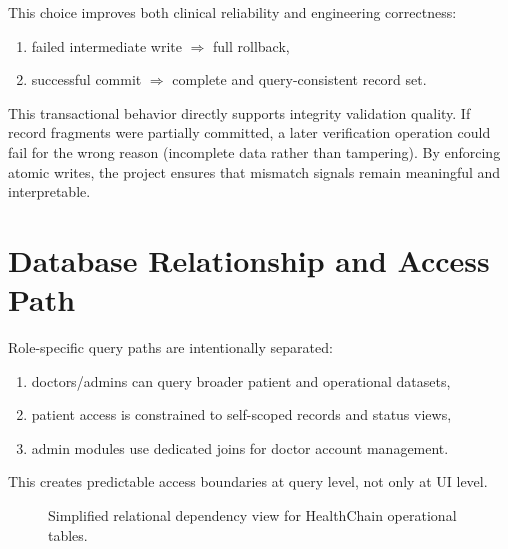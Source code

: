 \documentclass[12pt,a4paper]{report}
\begin{document}
This choice improves both clinical reliability and engineering correctness:

\begin{enumerate}
\item failed intermediate write $\Rightarrow$ full rollback,
\item successful commit $\Rightarrow$ complete and query-consistent record set.
\end{enumerate}

This transactional behavior directly supports integrity validation quality. If record fragments were partially committed, a later verification operation could fail for the wrong reason (incomplete data rather than tampering). By enforcing atomic writes, the project ensures that mismatch signals remain meaningful and interpretable.

\section{Database Relationship and Access Path}

Role-specific query paths are intentionally separated:

\begin{enumerate}
\item doctors/admins can query broader patient and operational datasets,
\item patient access is constrained to self-scoped records and status views,
\item admin modules use dedicated joins for doctor account management.
\end{enumerate}

This creates predictable access boundaries at query level, not only at UI level.

\begin{figure}[htbp]
\centering
{}
\caption{Simplified relational dependency view for HealthChain operational tables.}
\label{fig:db-dependency-view}
\end{figure}
\end{document}
